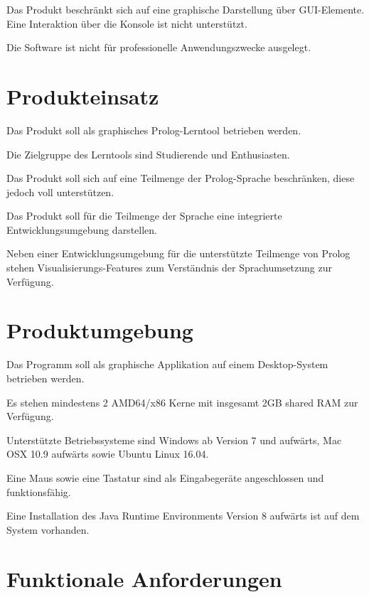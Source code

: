 \documentclass[parskip=full,11pt,twoside]{scrartcl}
\begin{document}
Das Produkt beschränkt sich auf eine graphische Darstellung über GUI-Elemente. Eine Interaktion über die Konsole ist nicht unterstützt.


Die Software ist nicht für professionelle Anwendungszwecke ausgelegt.

\pagebreak
\section{Produkteinsatz}

Das Produkt soll als graphisches Prolog-Lerntool betrieben werden.

Die Zielgruppe des Lerntools sind Studierende und Enthusiasten.

Das Produkt soll sich auf eine Teilmenge der Prolog-Sprache beschränken, diese jedoch voll unterstützen.

Das Produkt soll für die Teilmenge der Sprache eine integrierte Entwicklungsumgebung darstellen.

Neben einer Entwicklungsumgebung für die unterstützte Teilmenge von Prolog stehen Visualisierungs-Features zum Verständnis der Sprachumsetzung zur Verfügung.

\section{Produktumgebung}

Das Programm soll als graphische Applikation auf einem Desktop-System betrieben werden.

Es stehen mindestens 2 AMD64/x86 Kerne mit insgesamt 2GB shared RAM zur Verfügung.

Unterstützte Betriebssysteme sind Windows ab Version 7 und aufwärts, Mac OSX 10.9 aufwärts sowie Ubuntu Linux 16.04.

Eine Maus sowie eine Tastatur sind als Eingabegeräte angeschlossen und funktionsfähig.

Eine Installation des Java Runtime Environments Version 8 aufwärts ist auf dem System vorhanden.

\section{Funktionale Anforderungen}

\end{document}

